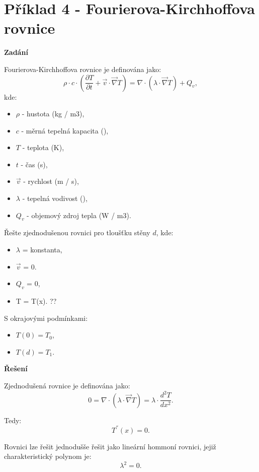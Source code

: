 \documentclass{article}
\begin{document}
\section*{Příklad 4 - Fourierova-Kirchhoffova rovnice}

\textbf{Zadání}

Fourierova-Kirchhoffova rovnice je definována jako:
\begin{equation}
    \rho \cdot c \cdot \left( \frac{\partial T}{\partial t} + \vec{v} \cdot \vec{\nabla} T \right) = \nabla \cdot \left( \lambda \cdot \vec{\nabla} T \right) + Q_v,
\end{equation}
kde:
\begin{itemize}
    \item $\rho$ - hustota (kg / m3),
    \item $c$ - měrná tepelná kapacita (\ueqJandKGinvKinv),
    \item $T$ - teplota (K),
    \item $t$ - čas (s),
    \item $\vec{v}$ - rychlost (m / s),
    \item $\lambda$ - tepelná vodivost (\ueqJandKGinvKinv),
    \item $Q_v$ - objemový zdroj tepla (W / m3).
\end{itemize}

Řešte zjednodušenou rovnici pro tloušťku stěny $d$, kde:

\begin{itemize}
    \item $\lambda$ = konstanta,
    \item $\vec{v}$ = 0.
    \item $Q_v$ = 0,
    \item T = T(x). ??
\end{itemize}

S okrajovými podmínkami:
\begin{itemize}
    \item $T(0) = T_0$,
    \item $T(d) = T_1$.
\end{itemize}

\textbf{Řešení}

Zjednodušená rovnice je definována jako:
$$
    0 = \nabla \cdot \left( \lambda \cdot \vec{\nabla} T \right) = \lambda \cdot \frac{d^2 T}{d x^2}.
$$

Tedy:
$$
    T^{''}(x) = 0.
$$

Rovnici lze řešit jednodušše řešit jako lineární hommoní rovnici, jejiž charakteristický polynom je:
$$
    \lambda^2 = 0.
$$
\end{document}
